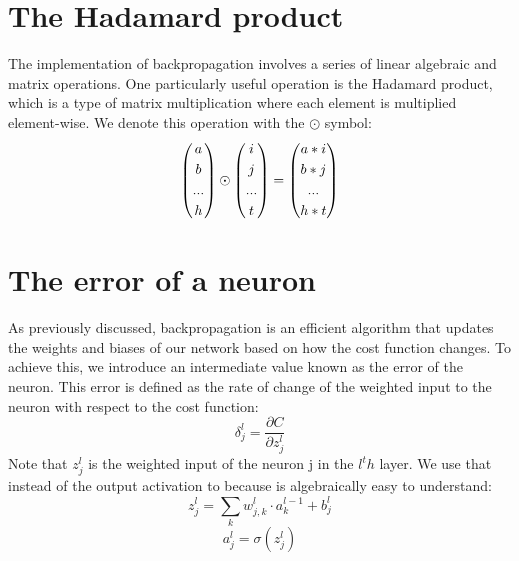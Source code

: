 \documentclass[../main]{subfiles}
\begin{document}
\section{The Hadamard product}
The implementation of backpropagation involves a series of linear algebraic and matrix operations. One particularly useful operation is the Hadamard product, which is a type of matrix multiplication where each element is multiplied element-wise. We denote this operation with the $\odot$ symbol:
\begin{equation*}
\begin{pmatrix}
a\vspace{0.1cm}\\ 
b\vspace{0.1cm}\\ 
...\vspace{0.1cm}\\
h
\end{pmatrix} \odot \begin{pmatrix}
i\vspace{0.1cm}\\ 
j\vspace{0.1cm}\\ 
...\vspace{0.1cm}\\
t
\end{pmatrix} = \begin{pmatrix}
a*i\vspace{0.1cm}\\ 
b*j\vspace{0.1cm}\\ 
...\vspace{0.1cm}\\
h*t
\end{pmatrix}
\end{equation*}
\section{The error of a neuron}
As previously discussed, backpropagation is an efficient algorithm that updates the weights and biases of our network based on how the cost function changes. To achieve this, we introduce an intermediate value known as the error of the neuron. This error is defined as the rate of change of the weighted input to the neuron with respect to the cost function:
\begin{equation*}
    \delta_{j}^{l} = \frac{\partial C}{\partial z_{j}^{l}}
\end{equation*}
Note that $z_{j}^{l}$ is the weighted input of the neuron j in the $l^th$ layer. We use that instead of the output activation to because is algebraically easy to understand:
\begin{equation*}
    z_{j}^{l} = \sum_k w_{j,k}^{l}\cdot a_{k}^{l-1} + b_{j}^l
\end{equation*}
\begin{equation*}
    a_{j}^{l} = \sigma (z_{j}^{l})
\end{equation*}
\end{document}
